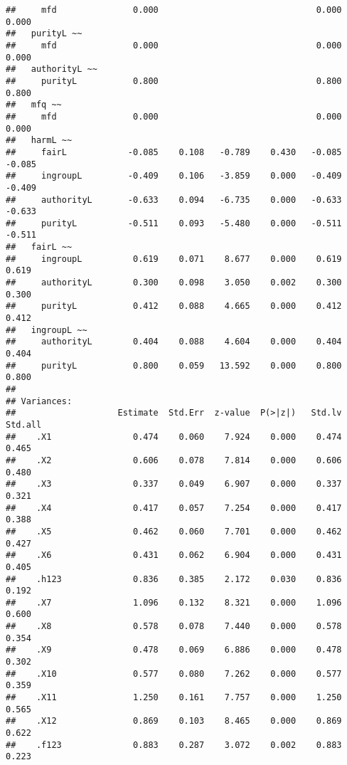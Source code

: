 \documentclass[english,man]{apa6}
\newcounter{author}
\theoremstyle{definition}
\theoremstyle{definition}
\theoremstyle{definition}
\theoremstyle{remark}
\begin{document}
\begin{verbatim}
##     mfd               0.000                               0.000    0.000
##   purityL ~~                                                            
##     mfd               0.000                               0.000    0.000
##   authorityL ~~                                                         
##     purityL           0.800                               0.800    0.800
##   mfq ~~                                                                
##     mfd               0.000                               0.000    0.000
##   harmL ~~                                                              
##     fairL            -0.085    0.108   -0.789    0.430   -0.085   -0.085
##     ingroupL         -0.409    0.106   -3.859    0.000   -0.409   -0.409
##     authorityL       -0.633    0.094   -6.735    0.000   -0.633   -0.633
##     purityL          -0.511    0.093   -5.480    0.000   -0.511   -0.511
##   fairL ~~                                                              
##     ingroupL          0.619    0.071    8.677    0.000    0.619    0.619
##     authorityL        0.300    0.098    3.050    0.002    0.300    0.300
##     purityL           0.412    0.088    4.665    0.000    0.412    0.412
##   ingroupL ~~                                                           
##     authorityL        0.404    0.088    4.604    0.000    0.404    0.404
##     purityL           0.800    0.059   13.592    0.000    0.800    0.800
## 
## Variances:
##                    Estimate  Std.Err  z-value  P(>|z|)   Std.lv  Std.all
##    .X1                0.474    0.060    7.924    0.000    0.474    0.465
##    .X2                0.606    0.078    7.814    0.000    0.606    0.480
##    .X3                0.337    0.049    6.907    0.000    0.337    0.321
##    .X4                0.417    0.057    7.254    0.000    0.417    0.388
##    .X5                0.462    0.060    7.701    0.000    0.462    0.427
##    .X6                0.431    0.062    6.904    0.000    0.431    0.405
##    .h123              0.836    0.385    2.172    0.030    0.836    0.192
##    .X7                1.096    0.132    8.321    0.000    1.096    0.600
##    .X8                0.578    0.078    7.440    0.000    0.578    0.354
##    .X9                0.478    0.069    6.886    0.000    0.478    0.302
##    .X10               0.577    0.080    7.262    0.000    0.577    0.359
##    .X11               1.250    0.161    7.757    0.000    1.250    0.565
##    .X12               0.869    0.103    8.465    0.000    0.869    0.622
##    .f123              0.883    0.287    3.072    0.002    0.883    0.223

\end{verbatim}
\end{document}
